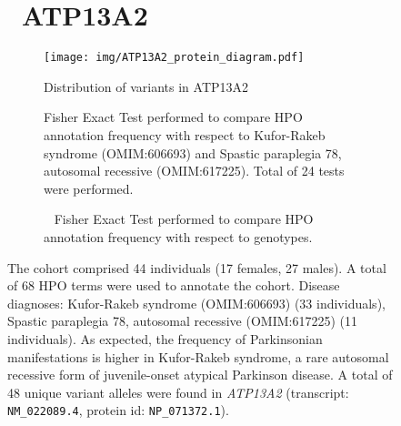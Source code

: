 \begin{figure}[htbp]
\section*{ ATP13A2}
\centering
\begin{subfigure}[b]{0.95\textwidth}
\centering
\texttt{[image:  img/ATP13A2\_protein\_diagram.pdf]} 
\captionsetup{justification=raggedright,singlelinecheck=false}
\caption{Distribution of variants in ATP13A2}
\end{subfigure}

\vspace{2em}

\begin{subfigure}[b]{0.95\textwidth}
\centering
{}
\captionsetup{justification=raggedright,singlelinecheck=false}
\caption{Fisher Exact Test performed to compare HPO annotation frequency with respect to 
Kufor-Rakeb syndrome (OMIM:606693) and Spastic paraplegia 78, autosomal recessive (OMIM:617225).
Total of 24 tests were performed. }
\end{subfigure}
\vspace{2em}
\begin{subfigure}[b]{0.95\textwidth}
\centering
{}
\captionsetup{justification=raggedright,singlelinecheck=false}
\caption{             Fisher Exact Test performed to compare HPO annotation frequency with respect to genotypes. }
\end{subfigure}

\vspace{2em}

\caption{The cohort comprised 44 individuals (17 females, 27 males). A total of 68 HPO terms were used to annotate the cohort. 
Disease diagnoses: Kufor-Rakeb syndrome (OMIM:606693) (33 individuals), Spastic paraplegia 78, autosomal recessive (OMIM:617225) 
(11 individuals). As expected, the frequency of Parkinsonian manifestations is higher in Kufor-Rakeb syndrome,
 a rare autosomal recessive form of juvenile-onset atypical Parkinson disease. A total of 48 unique variant alleles were found in \textit{ATP13A2} (transcript: \texttt{NM\_022089.4}, protein id: \texttt{NP\_071372.1}).}
\end{figure}
